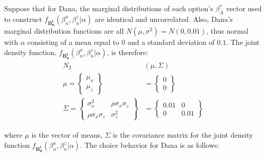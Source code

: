 \documentclass[../main.tex]{subfiles}
\begin{document}
Suppose that for Dana, the marginal distributions of each option's $\beta_A^*$ vector used to construct $f_{\mathbf{B_n^t}}(\beta_n^ x,\beta_n^ z|\alpha)$ are identical and uncorrelated.{\footnotemark}
Also, Dana's marginal distribution functions are all $N(\mu,\sigma^2) = N(0,0.01)$, thus normal with $\alpha$ consisting of a mean equal to $0$ and a standard deviation of $0.1$.
The joint density function, $f_{\mathbf{B_n^t}}(\beta_n^x,\beta_n^z|\alpha)$, is therefore:
\begin{align}
	\begin{split}
		N_2&(\mu,\Sigma) \\
		\mu =\begin{Bmatrix}\mu_x \\ \mu_z\end{Bmatrix} &= \begin{Bmatrix}0\\0\end{Bmatrix}\\
		\Sigma =\begin{Bmatrix} \sigma_x^2 & \rho\sigma_x\sigma_z \\  \rho\sigma_x\sigma_z & \sigma_z^2 \end{Bmatrix} &=
	\begin{Bmatrix} 0.01 & 0 \\  0 & 0.01 \end{Bmatrix}
	\end{split}
\end{align}
\addtocounter{footnote}{-1}
\noindent where $\mu$ is the vector of means, $\Sigma$ is the covariance matrix for the joint density function $f_{\mathbf{B_n^t}}(\beta_n^x,\beta_n^z|\alpha)$.
The choice behavior for Dana is as follows:
\end{document}
